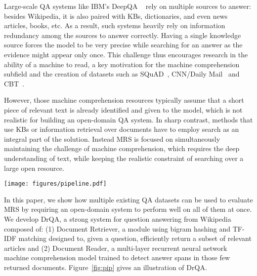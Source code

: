 \documentclass[11pt,a4paper]{article}
\newcommand\us{DrQA\xspace}
\newcommand\usr{Document Retriever\xspace}
\newcommand\usp{Document Reader\xspace}
\begin{document}
Large-scale QA systems like IBM's DeepQA ~\cite{ferrucci2010building} rely on multiple sources to answer: besides Wikipedia, it is also paired with KBs, dictionaries, and even news articles, books, etc. As a result, such systems heavily rely on information redundancy among the sources to answer correctly. Having a single knowledge source forces the model to be very precise while searching for an answer as the evidence might appear only once. This challenge thus encourages research in the ability of a machine to read, a key motivation for the machine comprehension subfield and the creation of datasets such as SQuAD~\cite{rajpurkar2016squad}, CNN/Daily Mail~\cite{nips2015hermann} and CBT~\cite{hill2015goldilocks}.

However, those machine comprehension resources typically assume that a short piece of relevant text is already identified and given to the model, which is not realistic for building an open-domain QA system. In sharp contrast, methods that use KBs or information retrieval over documents have to employ search as an integral part of the solution. Instead MRS is focused on simultaneously maintaining the challenge of machine comprehension, which requires the deep understanding of text, while keeping the realistic constraint of searching over a large open resource.

\begin{figure*}
    \begin{center}
    \texttt{[image: figures/pipeline.pdf]}
    \end{center}
    \vspace{-1em}
    \caption{\label{fig:pip} An overview of our question answering system \us. }
\end{figure*}


%
%

In this paper, we show how multiple existing QA datasets can be used to evaluate MRS by requiring an open-domain system to perform well on all of them at once.
We develop \us, a strong system for question answering from Wikipedia composed of: (1)  \usr, a module using bigram hashing and TF-IDF matching  designed to, given a question, efficiently return a subset of relevant articles and (2) \usp, a multi-layer recurrent neural network machine comprehension
model trained to detect answer spans in those few returned  documents.
%
Figure~\ref{fig:pip} gives an illustration of \us.
%
%
\end{document}
